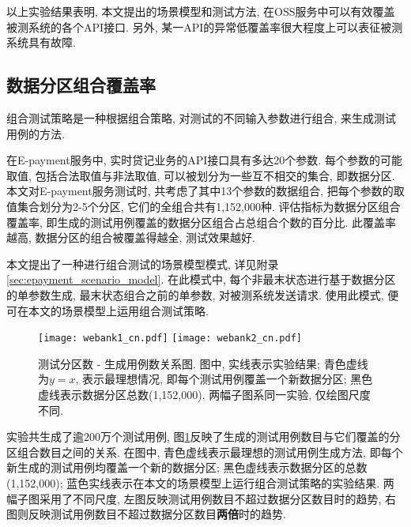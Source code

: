             以上实验结果表明, 本文提出的场景模型和测试方法, 在OSS服务中可以有效覆盖被测系统的各个API接口. 另外, 某一API的异常低覆盖率很大程度上可以表征被测系统具有故障.
        
        \subsection{数据分区组合覆盖率}
        
            \label{sec:partition}
            
            组合测试策略\cite{grindal2005combination}是一种根据组合策略, 对测试的不同输入参数进行组合, 来生成测试用例的方法.
            
            在E-payment服务中, 实时贷记业务的API接口具有多达20个参数. 每个参数的可能取值, 包括合法取值与非法取值, 可以被划分为一些互不相交的集合, 即数据分区. 本文对E-payment服务测试时, 共考虑了其中13个参数的数据组合, 把每个参数的取值集合划分为2-5个分区,  它们的全组合共有1,152,000种. 评估指标为数据分区组合覆盖率, 即生成的测试用例覆盖的数据分区组合占总组合个数的百分比. 此覆盖率越高, 数据分区的组合被覆盖得越全, 测试效果越好. 
            
            本文提出了一种进行组合测试的场景模型模式, 详见附录\ref{sec:epayment_scenario_model}. 在此模式中, 每个非最末状态进行基于数据分区的单参数生成, 最末状态组合之前的单参数, 对被测系统发送请求. 使用此模式, 便可在本文的场景模型上运用组合测试策略.
            
            \begin{figure}[!htb]
                \centering
                \texttt{[image: webank1\_cn.pdf]}
                \texttt{[image: webank2\_cn.pdf]}
                \caption{测试分区数 - 生成用例数关系图. 图中, 实线表示实验结果; 青色虚线为$y=x$, 表示最理想情况, 即每个测试用例覆盖一个新数据分区; 黑色虚线表示数据分区总数(1,152,000). 两幅子图系同一实验, 仅绘图尺度不同.}
                \label{fig:partition}
            \end{figure}
            
            实验共生成了逾200万个测试用例, 图\ref{fig:partition}反映了生成的测试用例数目与它们覆盖的分区组合数目之间的关系. 在图中, 青色虚线表示最理想的测试用例生成方法, 即每个新生成的测试用例均覆盖一个新的数据分区; 黑色虚线表示数据分区的总数(1,152,000); 蓝色实线表示在本文的场景模型上运行组合测试策略的实验结果. 两幅子图采用了不同尺度, 左图反映测试用例数目不超过数据分区数目时的趋势, 右图则反映测试用例数目不超过数据分区数目\textbf{两倍}时的趋势.
            
